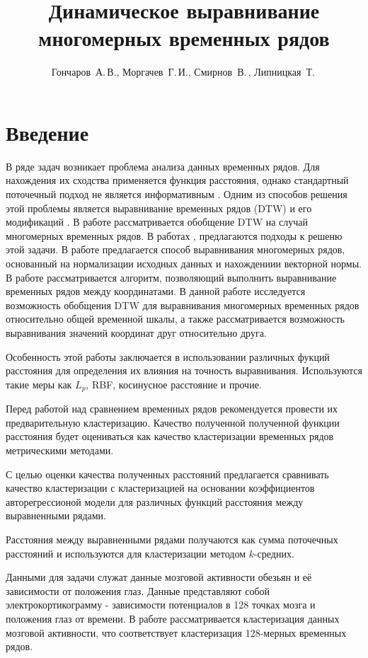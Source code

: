 \documentclass[12pt,twoside]{article}
\title
        {Динамическое выравнивание многомерных временных рядов}
\author
        {Гончаров~А.\,В., Моргачев~Г.\,И., Смирнов~В.\,, Липницкая~Т.\,} %
\begin{document}
    \maketitle
    \section{Введение}
				
				В ряде задач возникает проблема анализа данных временных рядов. Для нахождения их сходства применяется функция расстояния, однако стандартный поточечный подход не является информативным \cite{01f4ab11a9ff49ff909094a135dcfe33}. Одним из способов решения этой проблемы является выравнивание временных рядов (DTW)  \cite{Keogh01derivativedynamic} и его модификаций \cite{journals/ida/SalvadorC07}. В работе рассматривается обобщение DTW на случай многомерных временных рядов. В работах \cite{Holt2007}, \cite{Sanguansat2012MultipleMS} предлагаются подходы к решеню этой задачи. В работе \cite{Holt2007} предлагается способ выравнивания многомерных рядов, основанный на нормализации исходных данных и нахождениии векторной нормы. В работе \cite{Sanguansat2012MultipleMS} рассматривается алгоритм, позволяющий выполнить выравнивание временных рядов между координатами. В данной работе исследуется возможность обобщения DTW для выравнивания многомерных временных рядов относительно общей временной шкалы, а также рассматривается возможность выравнивания значений координат друг относительно друга.
				
				Особенность этой работы заключается в использовании различных фукций расстояния для определения их влияния на точность выравнивания. Используются такие меры как $L_p$, RBF, косинусное расстояние и прочие.
				
				Перед работой над сравнением временных рядов рекомендуется провести их предварительную кластеризацию. Качество полученной полученной функции расстояния будет оцениваться как качество кластеризации временных рядов метрическими методами.
				
				С целью оценки качества полученных расстояний предлагается сравнивать качество кластеризации с кластеризацией на основании коэффициентов авторегрессионой модели для различных функций расстояния между выравненными рядами.
				
				Расстояния между выравненными рядами получаются как сумма поточечных расстояний и используются для кластеризации методом $k$\--средних.
				
				Данными для задачи служат данные мозговой активности обезьян и её зависимости от положения глаз. Данные представляют собой электрокортикограмму - зависимости потенциалов в 128 точках мозга и положения глаз от времени. В работе рассматривается кластеризация данных мозговой активности, что соответствует кластеризация 128-мерных временных рядов.
				
\end{document}

